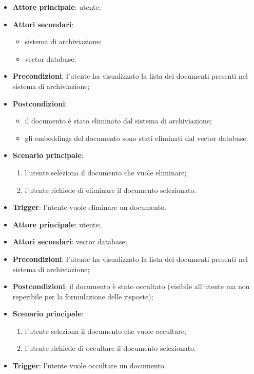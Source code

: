 \documentclass[10pt, a4paper]{article}
\begin{document}
    \begin{itemize}
        \item \textbf{Attore principale}: utente;
        \item \textbf{Attori secondari}:
        \begin{itemize}
            \item sistema di archiviazione;
            \item vector database.
        \end{itemize}
        \item \textbf{Precondizioni}: l’utente ha visualizzato la lista dei documenti presenti nel sistema di archiviazione;
        \item \textbf{Postcondizioni}:
        \begin{itemize}
            \item il documento è stato eliminato dal sistema di archiviazione;
            \item gli embeddings del documento sono stati eliminati dal vector database.
        \end{itemize}
        \item \textbf{Scenario principale}:
            \begin{enumerate}
                \item l’utente seleziona il documento che vuole eliminare;
                \item l’utente richiede di eliminare il documento selezionato.
            \end{enumerate}
        \item \textbf{Trigger}: l’utente vuole eliminare un documento.
    \end{itemize}

    \begin{itemize}
        \item \textbf{Attore principale}: utente;
        \item \textbf{Attori secondari}: vector database;
        \item \textbf{Precondizioni}: l’utente ha visualizzato la lista dei documenti presenti nel sistema di archiviazione;
        \item \textbf{Postcondizioni}: il documento è stato occultato (visibile all’utente ma non reperibile per la formulazione delle risposte);
        \item \textbf{Scenario principale}:
            \begin{enumerate}
                \item l’utente seleziona il documento che vuole occultare;
                \item l’utente richiede di occultare il documento selezionato.
            \end{enumerate}
        \item \textbf{Trigger}: l’utente vuole occultare un documento.
    \end{itemize}
\end{document}
